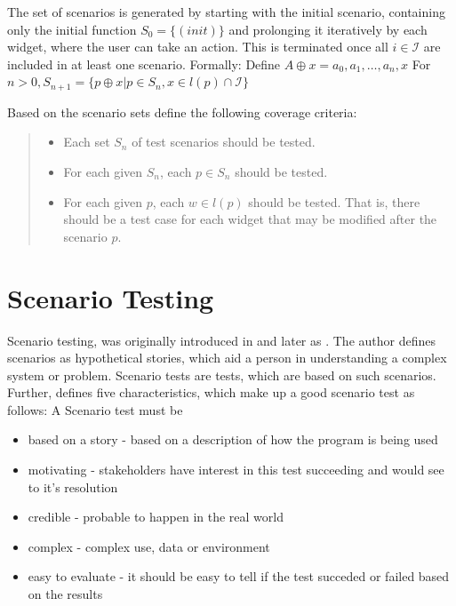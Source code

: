 The set of scenarios is generated by starting with the initial scenario, containing only the initial function $S_0 = \{(init)\}$ and prolonging it iteratively by each widget, where the user can take an action. This is terminated once all $i \in \mathcal{I}$ are included in at least one scenario. Formally:
Define $A \oplus x = a_0,a_1,\ldots,a_n,x$ For $n > 0, S_{n+1}= \{ p \oplus x |p \in S_n, x \in l(p) \cap \mathcal{I}\}$ 

Based on the scenario sets \textcite{zhang2019scenario} define the following coverage criteria:
\begin{quote}
  

\begin{itemize}
  \item Each set $S_n$ of test scenarios should be tested.
  \item For each given $S_n$, each $p \in S_n$ should be tested.
  \item For each given $p$, each $w \in l(p)$ should be tested. That is, there should be a
  test case for each widget that may be modified after the scenario $p$.
\end{itemize} 
\end{quote}

\section{Scenario Testing}
Scenario testing, was originally introduced in \textcite{kaner2003power} and later as \textcite{kaner2013introduction}. The author defines scenarios as hypothetical stories, which aid a person in understanding a complex system or problem. Scenario tests are tests, which are based on such scenarios.  \parencite[1]{kaner2013introduction}
Further, \parencite[2-5]{kaner2003power} defines five characteristics, which make up a good scenario test as follows:
A Scenario test must be
\begin{itemize}
     \item based on a story - based on a description of how the program is being used
    \item motivating - stakeholders have interest in this test succeeding and would see to it's resolution
    \item credible - probable to happen in the real world
    \item complex - complex use, data or environment
    \item easy to evaluate - it should be easy to tell if the test succeded or failed based on the results 
\end{itemize}

